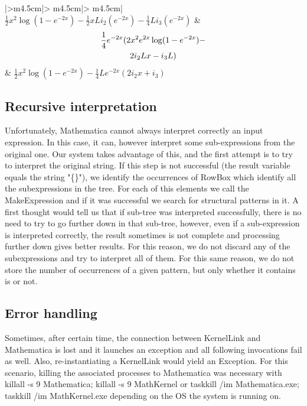 \begin{longtable}{|>{\centering\arraybackslash}m{4.5cm}|>
{\centering\arraybackslash}m{4.5cm}|>
{\centering\arraybackslash}m{4.5cm}|}
\scriptsize{ $\frac{1}{2} x^2 \log \left(1-e^{-2 x}\right) - \frac{1}{2} x L i_ 2 \left(e^{-2 x}\right)-\frac{1}{4} L i_ 3 \left(e^{-2 x}\right)$ }          & \scriptsize { \begin{multline}  \frac{1}{4} e^{-2 x} (2 x^2 e^{2 x} \log (1-e^{-2 x})- \notag\\ 2 i_ 2 L x-i_ 3 L)  \end{multline} } & \scriptsize{ $\frac{1}{2} x^2 \log \left(1-e^{-2 x}\right)-\frac{1}{4} L e^{-2 x} \left(2 i_ 2 x+i_ 3\right)$ }      \\
\hline
\caption{Comparison of different simplification modes}

\label{comparison_simplification}

\end{longtable}
\subsection{Recursive interpretation}
Unfortunately, Mathematica cannot always interpret correctly an input expression. In this case, it can, however interpret some sub-expressions from the original one. Our system takes advantage of this, and the first attempt is to try to interpret the original string. If this step is not successful (the result variable equals the string "\{\}"), we identify the occurrences of {\codefont RowBox} which identify all the subexpressions in the tree. For each of this elements we call the {\codefont MakeExpression} and if it was successful we search for structural patterns in it. A first thought would tell us that if sub-tree was interpreted successfully, there is no need to try to go further down in that sub-tree, however, even if a sub-expression is interpreted correctly, the result sometimes is not complete and processing further down gives better results. For this reason, we do not discard any of the subexpressions and try to interpret all of them. For this same reason, we do not store the number of occurrences of a given pattern, but only whether it contains is or not.

\subsection{Error handling}
Sometimes, after certain time, the connection between {\codefont KernelLink} and {\codefont Mathematica} is lost and it launches an exception and all following invocations fail as well.
Also, re-instantiating a KernelLink would yield an Exception. For this scenario, killing the associated processes to Mathematica was necessary with {\codefont killall -s 9 Mathematica; killall -s 9 MathKernel
} or {\codefont taskkill /im Mathematica.exe; taskkill /im MathKernel.exe} depending on the OS the system is running on.

